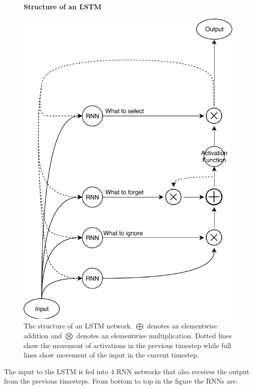 \begin{description}
        \begin{figure}
            \centering
            \textbf{Structure of an \gls{LSTM}}\par\medskip
            \includegraphics[scale=0.5]{./pictures/method/LSTM}
            \caption{The structure of an \gls{LSTM} network. $\bigoplus$ denotes
                an elementwise addition and $\bigotimes$ denotes an elementwise
                multiplication. Dotted lines show the movement of activations in
                the previous timestep while full lines show movement of the
                input in the current timestep.}
            \label{fig:lstm}
        \end{figure}

        The input to the \gls{LSTM} is fed into 4 \gls{RNN} networks that also
        receives the output from the previous timesteps. From bottom to top in
        the figure the \glspl{RNN} are:


\end{description}
